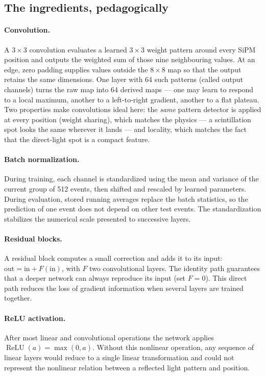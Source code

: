 \documentclass[11pt,a4paper]{article}
\begin{document}
\subsection{The ingredients, pedagogically}

\paragraph{Convolution.} A $3\times3$ convolution evaluates a learned $3\times3$
weight pattern around every SiPM position and outputs the weighted sum of those nine
neighbouring values. At an edge, zero padding supplies values outside the $8\times8$
map so that the output retains the same dimensions. One layer with 64 such patterns
(called output channels) turns the raw map into 64 derived maps --- one may learn to
respond to a local maximum, another to a left-to-right gradient, another to a
flat plateau. Two properties make convolutions ideal here: the \emph{same}
pattern detector is applied at every position (weight sharing), which matches
the physics --- a scintillation spot looks the same wherever it lands --- and
locality, which matches the fact that the direct-light spot is a compact
feature.

\paragraph{Batch normalization.} During training, each channel is standardized using
the mean and variance of the current group of 512 events, then shifted and rescaled by
learned parameters. During evaluation, stored running averages replace the batch
statistics, so the prediction of one event does not depend on other test events. The
standardization stabilizes the numerical scale presented to successive layers.

\paragraph{Residual blocks.} A residual block computes a small correction and
adds it to its input: $\mathrm{out} = \mathrm{in} + F(\mathrm{in})$, with $F$
two convolutional layers. The identity path guarantees that a deeper network
can always reproduce its input (set $F = 0$). This direct path reduces the loss of
gradient information when several layers are trained together.

\paragraph{ReLU activation.} After most linear and convolutional operations the
network applies $\operatorname{ReLU}(a)=\max(0,a)$. Without this nonlinear operation,
any sequence of linear layers would reduce to a single linear transformation and could
not represent the nonlinear relation between a reflected light pattern and position.
\end{document}
